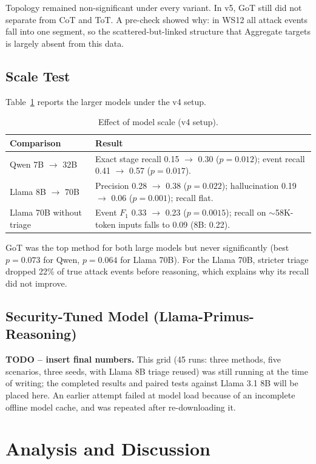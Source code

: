 \documentclass[a4paper, 12pt]{report}
\theoremstyle{definition}
\begin{document}
Topology remained non-significant under every variant. In v5, GoT still did not separate from CoT and ToT. A pre-check showed why: in WS12 all attack events fall into one segment, so the scattered-but-linked structure that Aggregate targets is largely absent from this data.

\section{Scale Test}
Table~\ref{tab:scale} reports the larger models under the v4 setup.

\begin{table}[h]
\centering
\caption{Effect of model scale (v4 setup).}
\label{tab:scale}
\begin{tabular}{p{3.6cm}p{9.2cm}}
\toprule
Comparison & Result \\
\midrule
Qwen 7B $\to$ 32B & Exact stage recall 0.15 $\to$ 0.30 ($p=0.012$); event recall 0.41 $\to$ 0.57 ($p=0.017$). \\
Llama 8B $\to$ 70B & Precision 0.28 $\to$ 0.38 ($p=0.022$); hallucination 0.19 $\to$ 0.06 ($p=0.001$); recall flat. \\
Llama 70B without triage & Event $F_1$ 0.33 $\to$ 0.23 ($p=0.0015$); recall on $\sim$58K-token inputs falls to 0.09 (8B: 0.22). \\
\bottomrule
\end{tabular}
\end{table}

GoT was the top method for both large models but never significantly (best $p=0.073$ for Qwen, $p=0.064$ for Llama 70B). For the Llama 70B, stricter triage dropped 22\% of true attack events before reasoning, which explains why its recall did not improve.

\section{Security-Tuned Model (Llama-Primus-Reasoning)}
\textbf{TODO -- insert final numbers.} This grid (45 runs: three methods, five scenarios, three seeds, with Llama 8B triage reused) was still running at the time of writing; the completed results and paired tests against Llama 3.1 8B will be placed here. An earlier attempt failed at model load because of an incomplete offline model cache, and was repeated after re-downloading it.

\chapter{Analysis and Discussion}
\label{chap.7}
\end{document}
